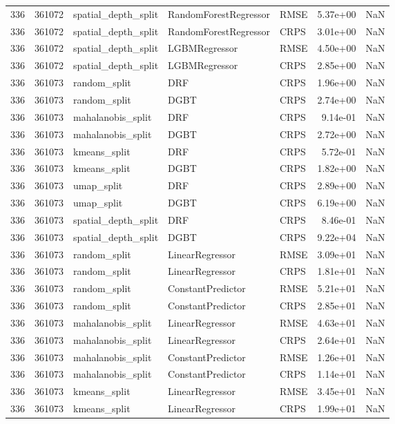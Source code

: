 \begin{tabular}{rrlllrr}
336 & 361072 & spatial\_depth\_split & RandomForestRegressor & RMSE & 5.37e+00 & NaN \\
336 & 361072 & spatial\_depth\_split & RandomForestRegressor & CRPS & 3.01e+00 & NaN \\
336 & 361072 & spatial\_depth\_split & LGBMRegressor & RMSE & 4.50e+00 & NaN \\
336 & 361072 & spatial\_depth\_split & LGBMRegressor & CRPS & 2.85e+00 & NaN \\
336 & 361073 & random\_split & DRF & CRPS & 1.96e+00 & NaN \\
336 & 361073 & random\_split & DGBT & CRPS & 2.74e+00 & NaN \\
336 & 361073 & mahalanobis\_split & DRF & CRPS & 9.14e-01 & NaN \\
336 & 361073 & mahalanobis\_split & DGBT & CRPS & 2.72e+00 & NaN \\
336 & 361073 & kmeans\_split & DRF & CRPS & 5.72e-01 & NaN \\
336 & 361073 & kmeans\_split & DGBT & CRPS & 1.82e+00 & NaN \\
336 & 361073 & umap\_split & DRF & CRPS & 2.89e+00 & NaN \\
336 & 361073 & umap\_split & DGBT & CRPS & 6.19e+00 & NaN \\
336 & 361073 & spatial\_depth\_split & DRF & CRPS & 8.46e-01 & NaN \\
336 & 361073 & spatial\_depth\_split & DGBT & CRPS & 9.22e+04 & NaN \\
336 & 361073 & random\_split & LinearRegressor & RMSE & 3.09e+01 & NaN \\
336 & 361073 & random\_split & LinearRegressor & CRPS & 1.81e+01 & NaN \\
336 & 361073 & random\_split & ConstantPredictor & RMSE & 5.21e+01 & NaN \\
336 & 361073 & random\_split & ConstantPredictor & CRPS & 2.85e+01 & NaN \\
336 & 361073 & mahalanobis\_split & LinearRegressor & RMSE & 4.63e+01 & NaN \\
336 & 361073 & mahalanobis\_split & LinearRegressor & CRPS & 2.64e+01 & NaN \\
336 & 361073 & mahalanobis\_split & ConstantPredictor & RMSE & 1.26e+01 & NaN \\
336 & 361073 & mahalanobis\_split & ConstantPredictor & CRPS & 1.14e+01 & NaN \\
336 & 361073 & kmeans\_split & LinearRegressor & RMSE & 3.45e+01 & NaN \\
336 & 361073 & kmeans\_split & LinearRegressor & CRPS & 1.99e+01 & NaN \\

\end{tabular}
